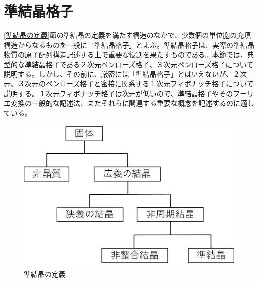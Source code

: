\documentclass[11pt,a4j]{jreport}
\begin{document}
\section{準結晶格子}
\ref{準結晶の定義}節の準結晶の定義を満たす構造のなかで、少数個の単位胞の充填構造からなるものを一般に「準結晶格子」とよぶ。準結晶格子は、実際の準結晶物質の原子配列構造記述する上で重要な役割を果たすものである。本節では、典型的な準結晶格子である２次元ペンローズ格子、３次元ペンローズ格子について説明する。しかし、その前に、厳密には「準結晶格子」とはいえないが、２次元、３次元のペンローズ格子と密接に関系する１次元フィボナッチ格子について説明する。１次元フィボナッチ格子は次元が低いので、準結晶格子やそのフーリエ変換の一般的な記述法、またそれらに関連する重要な概念を記述するのに適している。
\begin{figure}[htbp]
  \centering
  \vspace{10mm}
  \includegraphics[width=120mm]{./figure/quasicrystalline_define.png}
  \caption{準結晶の定義}
  \label{quasicrystalline_define}
\end{figure}
\end{document}
